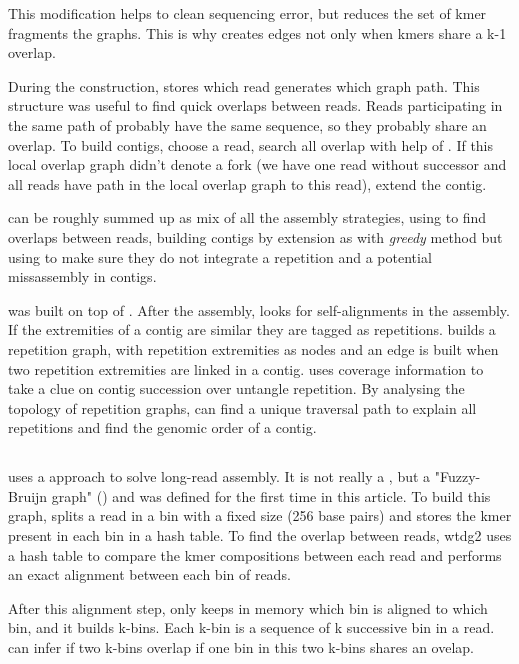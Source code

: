 \documentclass[main]{subfiles}
\begin{document}
This modification helps to clean sequencing error, but reduces the set of kmer fragments the \DBG graphs. This is why  creates edges not only when kmers share a k-1 overlap. 

During the  construction, \abruijn stores which read generates which graph path. This structure was useful to find quick overlaps between reads. Reads participating in the same path of  probably have the same sequence, so they probably share an overlap. To build contigs, \abruijn choose a read, search all overlap with help of . If this local overlap graph didn't denote a fork (we have one read without successor and all reads have path in the local overlap graph to this read), \abruijn extend the contig.

\abruijn can be roughly summed up as mix of all the assembly strategies, using \DBG to find overlaps between reads, building contigs by extension as with \textit{greedy} method but using \OLC to make sure they do not integrate a repetition and a potential missassembly in contigs.

\flye was built on top of \abruijn. After the \abruijn assembly, \flye looks for self-alignments in the assembly. If the extremities of a contig are similar they are tagged as repetitions. \flye builds a repetition graph, with repetition extremities as nodes and an edge is built when two repetition extremities are linked in a contig. \flye uses coverage information to take a clue on contig succession over untangle repetition. By analysing the topology of repetition graphs, \flye can find a unique traversal path to explain all repetitions and find the genomic order of a contig.

\subsection{\wtdbg}

\wtdbg \cite{wtdbg2}  uses a \DBG approach to solve long-read assembly. It is not really a \DBG, but a "Fuzzy-Bruijn graph" () and was defined for the first time in this article. To build this graph, \wtdbg splits a read in a bin with a fixed size (256 base pairs) and stores the kmer present in each bin in a hash table.
To find the overlap between reads, wtdg2 uses a hash table to compare the kmer compositions between each read and performs an exact alignment between each bin of reads.

After this alignment step, \wtdbg only keeps in memory which bin is aligned to which bin, and it builds k-bins. Each k-bin is a sequence of k successive bin in a read. \wtdbg can infer if two k-bins overlap if one bin in this two k-bins shares an ovelap.
\end{document}
